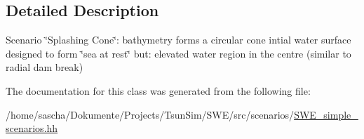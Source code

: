 \subsection{Detailed Description}
Scenario \char`\"{}\-Splashing Cone\char`\"{}\-: bathymetry forms a circular cone intial water surface designed to form \char`\"{}sea at rest\char`\"{} but\-: elevated water region in the centre (similar to radial dam break) 

The documentation for this class was generated from the following file\-:\begin{DoxyCompactItemize}
\item 
/home/sascha/\-Dokumente/\-Projects/\-Tsun\-Sim/\-S\-W\-E/src/scenarios/\hyperlink{SWE__simple__scenarios_8hh}{S\-W\-E\-\_\-simple\-\_\-scenarios.\-hh}\end{DoxyCompactItemize}
